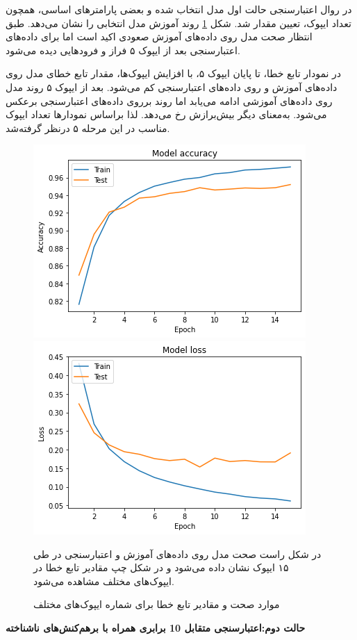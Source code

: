 در روال اعتبارسنجی حالت اول مدل انتخاب شده و بعضی پارامترهای اساسی، همچون تعداد ایپوک، تعیین مقدار شد. شکل
\ref{ModelSelection}
روند آموزش مدل انتخابی را نشان می‌دهد. طبق انتظار صحت مدل روی داده‌های آموزش صعودی اکید است اما برای داده‌های اعتبارسنجی بعد از ایپوک ۵ فراز و فرودهایی دیده می‌شود.

در نمودار تابع خطا، تا پایان ایپوک ۵، با افزایش ایپوک‌ها، مقدار تابع خطای مدل روی داده‌های آموزش و رو‌ی داده‌های اعتبارسنجی کم می‌شود. بعد از ایپوک ۵ روند مدل روی داده‌های آموزشی ادامه می‌یابد اما روند برروی داده‌های اعتبارسنجی برعکس می‌شود. به‌معنای دیگر بیش‌برازش رخ می‌دهد. لذا براساس نمودارها تعداد ایپوک مناسب در این مرحله ۵ درنظر گرفته‌شد.

\begin{figure}[!h]
	\begin{minipage}[b]{0.99\linewidth} 
    \includegraphics[width=.55\textwidth]{section4/ModelSelection/selectedModelAcc.png} 
    \includegraphics[width=.55\textwidth]{section4/ModelSelection/selectedModelLoss.png} 
\end{minipage}
	\caption{موارد صحت و مقادیر تابع خطا برای شماره ایپوک‌های مختلف}
در شکل راست صحت مدل روی داده‌های آموزش و اعتبارسنجی در طی ۱۵ ایپوک نشان داده می‌شود و در شکل چپ مقادیر تابع خطا در ایپوک‌های مختلف مشاهده می‌شود.
	\label{ModelSelection}
\end{figure}


\textbf{
حالت دوم:اعتبارسنجی متقابل 10 برابری همراه با برهم‌کنش‌های ناشناخته}

